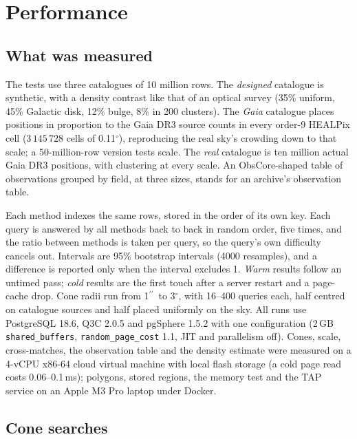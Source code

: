 \documentclass[final,5p,times,twocolumn,authoryear]{elsarticle}
\newcommand{\arcsec}{\ensuremath{^{\prime\prime}}}
\newcommand{\degr}{\ensuremath{^{\circ}}}
\begin{document}
\section{Performance}
\label{sec:tests}

\subsection{What was measured}
\label{sec:corpora}
\label{sec:protocol}

The tests use three catalogues of 10 million rows. The \emph{designed} catalogue is synthetic, with a density contrast like that of an
optical survey (35\% uniform, 45\% Galactic disk, 12\% bulge, 8\% in 200 clusters). The
\emph{Gaia} catalogue places positions in proportion to the Gaia DR3 source counts in
every order-9 HEALPix cell ($3\,145\,728$ cells of 0.11\degr), reproducing the real
sky's crowding down to that scale; a 50-million-row version tests scale. The \emph{real}
catalogue is ten million actual Gaia DR3 positions, with clustering at every scale. An
ObsCore-shaped table of observations grouped by field, at three sizes, stands for an
archive's observation table.

Each method indexes the same rows, stored in the order of its own key. Each query is
answered by all methods back to back in random order, five times, and the ratio between
methods is taken per query, so the query's own difficulty cancels out. Intervals are 95\% bootstrap intervals (4000
resamples), and a difference is reported only when the interval excludes 1. \emph{Warm}
results follow an untimed pass; \emph{cold} results are the first touch after a server
restart and a page-cache drop. Cone radii run from 1\arcsec\ to 3\degr, with 16--400
queries each, half centred on catalogue sources and half placed uniformly on the sky.
All runs use PostgreSQL 18.6, Q3C 2.0.5 and pgSphere 1.5.2 with one configuration
(2\,GB \texttt{shared\_buffers}, \texttt{random\_page\_cost} 1.1, JIT and parallelism
off). Cones, scale, cross-matches, the observation table and the density estimate were
measured on a 4-vCPU x86-64 cloud virtual machine with local flash storage (a cold page
read costs 0.06--0.1\,ms); polygons, stored regions, the memory test and the TAP service
on an Apple M3 Pro laptop under Docker.

\subsection{Cone searches}
\label{sec:cones}
\end{document}
